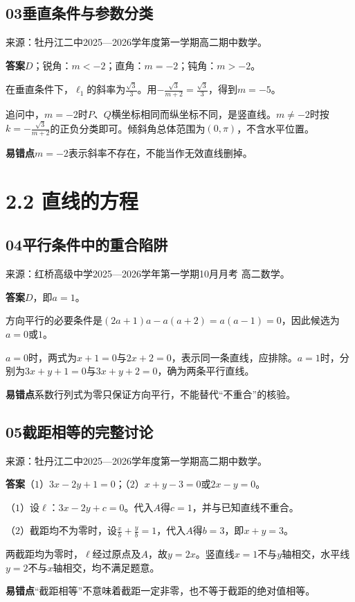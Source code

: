 \documentclass[UTF8,11pt,a4paper,fontset=windows]{ctexart}
\newcommand{\qhead}[2]{\subsection{#1\texorpdfstring{\quad}{ }#2}}
\newcommand{\qsource}[1]{{\footnotesize 来源：#1。\par}}
\begin{document}
\qhead{03}{垂直条件与参数分类}
\qsource{牡丹江二中2025—2026学年度第一学期高二期中数学}
\textbf{答案}\quad \(D\)；锐角：\(m< - 2\)；直角：\(m= - 2\)；钝角：\(m> - 2\)。\par
在垂直条件下，\(\ell _{1}\)的斜率为\(\frac{\sqrt{3}}{3}\)。用\(- \frac{\sqrt{3}}{m+ 2}= \frac{\sqrt{3}}{3}\)，得到\(m= - 5\)。\par
追问中，\(m= - 2\)时\(P\)、\(Q\)横坐标相同而纵坐标不同，是竖直线。\(m\ne - 2\)时按\(k= - \frac{\sqrt{3}}{m+ 2}\)的正负分类即可。倾斜角总体范围为\(\left(0,\allowbreak \pi \right)\)，不含水平位置。\par
{\small\textbf{易错点}\quad \(m= - 2\)表示斜率不存在，不能当作无效直线删掉。\par}

\clearpage

\section{2.2 直线的方程}


\qhead{04}{平行条件中的重合陷阱}
\qsource{红桥高级中学2025—2026学年第一学期10月月考 高二数学}
\textbf{答案}\quad \(D\)，即\(a= 1\)。\par
方向平行的必要条件是\(\left(2a+ 1\right)a- a\left(a+ 2\right)= a\left(a- 1\right)= 0\)，因此候选为\(a= 0\)或\(1\)。\par
\(a= 0\)时，两式为\(x+ 1= 0\)与\(2x+ 2= 0\)，表示同一条直线，应排除。\(a= 1\)时，分别为\(3x+ y+ 1= 0\)与\(3x+ y+ 2= 0\)，确为两条平行直线。\par
{\small\textbf{易错点}\quad 系数行列式为零只保证方向平行，不能替代“不重合”的核验。\par}

\qhead{05}{截距相等的完整讨论}
\qsource{牡丹江二中2025—2026学年度第一学期高二期中数学}
\textbf{答案}\quad （\(1\)）\(3x- 2y+ 1= 0\)；（\(2\)）\(x+ y- 3= 0\)或\(2x- y= 0\)。\par
（\(1\)）设\(\ell \)：\(3x- 2y+ c= 0\)。代入\(A\)得\(c= 1\)，并与已知直线不重合。\par
（\(2\)）截距均不为零时，设\(\frac{x}{b}+ \frac{y}{b}= 1\)，代入\(A\)得\(b= 3\)，即\(x+ y= 3\)。\par
两截距均为零时，\(\ell \)经过原点及\(A\)，故\(y= 2x\)。竖直线\(x= 1\)不与\(y\)轴相交，水平线\(y= 2\)不与\(x\)轴相交，均不满足题意。\par
{\small\textbf{易错点}\quad “截距相等”不意味着截距一定非零，也不等于截距的绝对值相等。\par}

\clearpage
\end{document}
